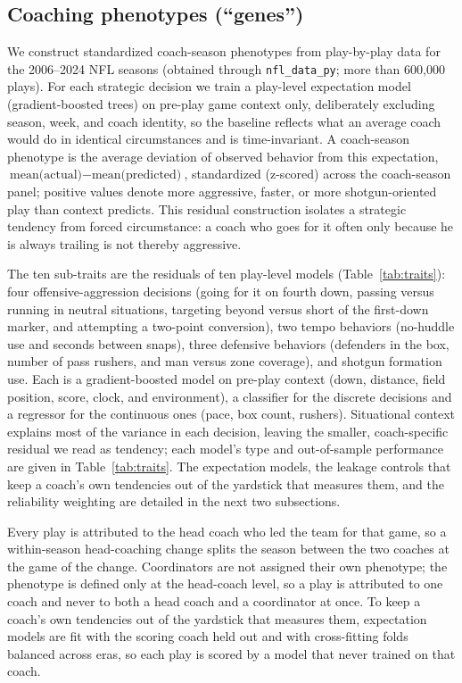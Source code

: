 \documentclass[11pt]{article}
\begin{document}
\subsection{Coaching phenotypes (``genes'')}
We construct standardized coach-season phenotypes from play-by-play data for the
2006--2024 NFL seasons (obtained through \texttt{nfl\_data\_py}; more than 600{,}000
plays). For each strategic decision we train a play-level expectation model
(gradient-boosted trees) on pre-play game context only, deliberately excluding
season, week, and coach identity, so the baseline reflects what an average coach
would do in identical circumstances and is time-invariant. A coach-season
phenotype is the average deviation of observed behavior from this expectation,
$\text{mean(actual)} - \text{mean(predicted)}$, standardized (z-scored) across the
coach-season panel; positive values denote more aggressive, faster, or more
shotgun-oriented play than context predicts. This residual construction isolates a
strategic tendency from forced circumstance: a coach who goes for it often only
because he is always trailing is not thereby aggressive.

The ten sub-traits are the residuals of ten play-level models (Table~\ref{tab:traits}):
four offensive-aggression decisions (going for it on fourth down, passing versus
running in neutral situations, targeting beyond versus short of the first-down
marker, and attempting a two-point conversion), two tempo behaviors (no-huddle use
and seconds between snaps), three defensive behaviors (defenders in the box, number
of pass rushers, and man versus zone coverage), and shotgun formation use. Each is a
gradient-boosted model on pre-play context (down, distance, field position, score,
clock, and environment), a classifier for the discrete decisions and a regressor for
the continuous ones (pace, box count, rushers). Situational context explains most of
the variance in each decision, leaving the smaller, coach-specific residual we read
as tendency; each model's type and out-of-sample performance are given in
Table~\ref{tab:traits}. The expectation models, the leakage controls that keep a
coach's own tendencies out of the yardstick that measures them, and the reliability
weighting are detailed in the next two subsections.

Every play is attributed to the head coach who led the team for that game, so a
within-season head-coaching change splits the season between the two coaches at the
game of the change. Coordinators are not assigned their own phenotype; the
phenotype is defined only at the head-coach level, so a play is attributed to one
coach and never to both a head coach and a coordinator at once. To keep a coach's
own tendencies out of the yardstick that measures them, expectation models are fit
with the scoring coach held out and with cross-fitting folds balanced across eras,
so each play is scored by a model that never trained on that coach.
\end{document}
